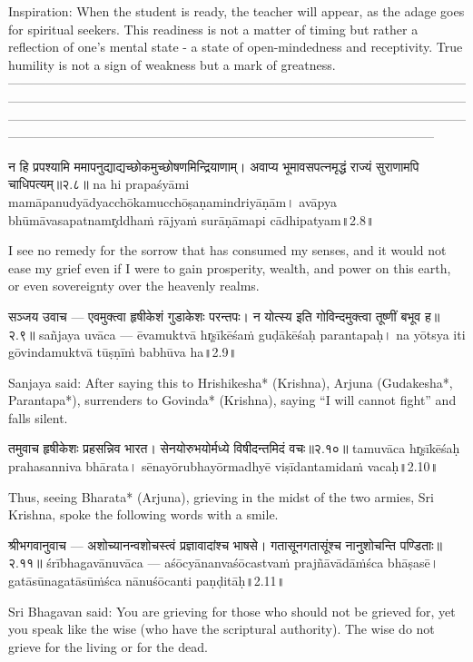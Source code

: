 Inspiration: 
When the student is ready, the teacher will appear, as the adage goes for spiritual seekers. This readiness is not a matter of timing but rather a reflection of one’s mental state - a state of open-mindedness and receptivity.
True humility is not a sign of weakness but a mark of greatness.
-----------------------------------------------------------------------------------------------------------------------------------------------------------------------------------------------------------------------------------------------------------------------------------------------------------------------------------------------------------------------------------------------------------------------------------------

न हि प्रपश्यामि ममापनुद्याद्यच्छोकमुच्छोषणमिन्द्रियाणाम्।
 अवाप्य भूमावसपत्नमृद्धं राज्यं सुराणामपि चाधिपत्यम्॥२.८॥
na hi prapaśyāmi mamāpanudyādyacchōkamucchōṣaṇamindriyāṇām।
avāpya bhūmāvasapatnamr̥ddhaṁ rājyaṁ surāṇāmapi cādhipatyam॥2.8॥

I see no remedy for the sorrow that has consumed my senses, and it would not ease my grief even if I were to gain prosperity, wealth, and power on this earth, or even sovereignty over the heavenly realms.

सञ्जय उवाच —
एवमुक्त्वा हृषीकेशं गुडाकेशः परन्तपः।
 न योत्स्य इति गोविन्दमुक्त्वा तूष्णीं बभूव ह॥२.९॥
sañjaya uvāca —
ēvamuktvā hr̥ṣīkēśaṁ guḍākēśaḥ parantapaḥ।
na yōtsya iti gōvindamuktvā tūṣṇīṁ babhūva ha॥2.9॥

Sanjaya said:
After saying this to Hrishikesha* (Krishna), Arjuna (Gudakesha*, Parantapa*), surrenders to Govinda* (Krishna), saying “I will cannot fight” and falls silent.

तमुवाच हृषीकेशः प्रहसन्निव भारत।
 सेनयोरुभयोर्मध्ये विषीदन्तमिदं वचः॥२.१०॥
tamuvāca hr̥ṣīkēśaḥ prahasanniva bhārata।
sēnayōrubhayōrmadhyē viṣīdantamidaṁ vacaḥ॥2.10॥

Thus, seeing Bharata* (Arjuna), grieving in the midst of the two armies, Sri Krishna, spoke the following words with a smile.

श्रीभगवानुवाच —
अशोच्यानन्वशोचस्त्वं प्रज्ञावादांश्च भाषसे।
 गतासूनगतासूंश्च नानुशोचन्ति पण्डिताः॥२.११॥
śrībhagavānuvāca —
aśōcyānanvaśōcastvaṁ prajñāvādāṁśca bhāṣasē।
gatāsūnagatāsūṁśca nānuśōcanti paṇḍitāḥ॥2.11॥

Sri Bhagavan said:
You are grieving for those who should not be grieved for, yet you speak like the wise (who have the scriptural authority). The wise do not grieve for the living or for the dead.

